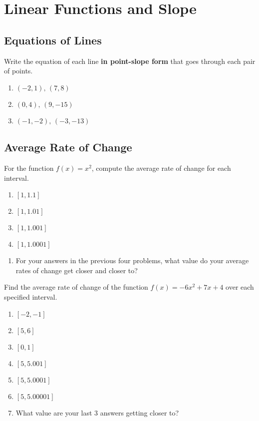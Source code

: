 \chapter{Linear Functions and Slope}

\section{Equations of Lines}

Write the equation of each line \textbf{in point-slope form} that goes through each pair of points.
\begin{enumerate}
\item $(-2, 1), \, (7,8)$
\item $(0,4), \, (9,-15)$
\item $(-1,-2), \, (-3,-13)$
\end{enumerate}

\section{Average Rate of Change}

For the function $f(x) = x^2$, compute the average rate of change for each interval.
\begin{enumerate}
\item $[1, 1.1]$
\item $[1, 1.01]$
\item $[1, 1.001]$
\item $[1,1.0001]$
\setcounter{Review}{\value{enumi}}
\end{enumerate}

\begin{enumerate}
\setcounter{enumi}{\value{Review}}
\item For your answers in the previous four problems, what value do your average rates of change get closer and closer to?
\setcounter{Review}{\value{enumi}}
\end{enumerate}

Find the average rate of change of the function $f(x) = -6x^2 + 7x + 4$ over each specified interval.
\begin{enumerate}
\setcounter{enumi}{\value{Review}}
\item $[-2, -1]$
\item $[5, 6]$
\item $[0, 1]$
\item $[5,5.001]$
\item $[5,5.0001]$
\item $[5,5.00001]$
\item What value are your last 3 answers getting closer to?
\setcounter{Review}{\value{enumi}}
\end{enumerate}

